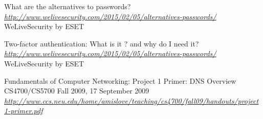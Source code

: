 \documentclass{article}
\begin{document}
\begin{thebibliography}{9}

  What are the alternatives to passwords?
  \emph{\url{http://www.welivesecurity.com/2015/02/05/alternatives-passwords/}}
  WeLiveSecurity by ESET
  
  Two-factor authentication: What is it ? and why do I need it?
  \emph{\url{http://www.welivesecurity.com/2015/02/05/alternatives-passwords/}}
  WeLiveSecurity by ESET

 Fundamentals of Computer Networking: Project 1 Primer: DNS Overview
 CS4700/CS5700 Fall 2009, 17 September 2009
 \emph{\url{http://www.ccs.neu.edu/home/amislove/teaching/cs4700/fall09/handouts/project1-primer.pdf}}

\end{thebibliography}
\end{document}
